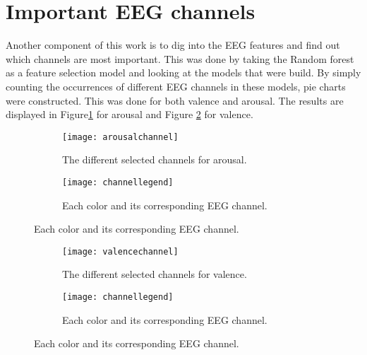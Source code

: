 \section{Important EEG channels}

Another component of this work is to dig into the EEG features and find out which channels are most important. This was done by taking the Random forest as a feature selection model and looking at the models that were build. By simply counting the occurrences of different EEG channels in these models, pie charts were constructed. This was done for both valence and arousal. The results are displayed in Figure\ref{arousalchannel} for arousal and Figure \ref{valencechannel} for valence.

\begin{figure}[H]
\centering
  \begin{subfigure}[b]{.5\textwidth}
    \texttt{[image: arousalchannel]}
    \caption{The different selected channels for arousal.\label{arousalchannel}}
  \end{subfigure}
\hfill
  \begin{subfigure}[b]{.4\textwidth}
    \texttt{[image: channellegend]}
    \caption{Each color and its corresponding EEG channel.}
  \end{subfigure}
\end{figure}

\begin{figure}[H]
\centering
  \begin{subfigure}[b]{.5\textwidth}
    \texttt{[image: valencechannel]}
    \caption{The different selected channels for valence.\label{valencechannel}}
  \end{subfigure}
\hfill
  \begin{subfigure}[b]{.4\textwidth}
    \texttt{[image: channellegend]}
    \caption{Each color and its corresponding EEG channel.}
  \end{subfigure}
\end{figure}

